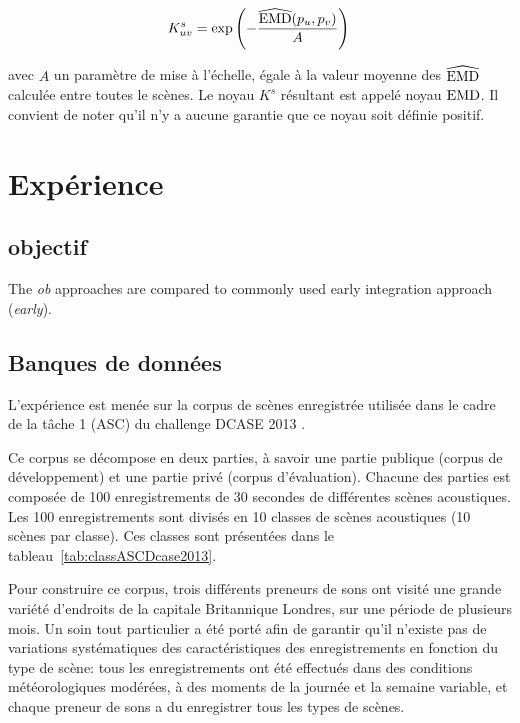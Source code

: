 \begin{equation}
\label{eq:ks}
K_{uv}^s = \exp\left( - \dfrac{\widehat{\mathrm{EMD}}(p_u,p_v)}{A} \right) \\
\end{equation}

avec $A$ un paramètre de mise à l'échelle, égale à la valeur moyenne des $\widehat{\mathrm{EMD}}$ calculée entre toutes le scènes. Le noyau $K^s$ résultant est appelé noyau $\mathrm{EMD}$. Il convient de noter qu'il n'y a aucune garantie que ce noyau soit définie positif.

\section{Expérience}

\subsection{objectif}


The \emph{ob} approaches are compared to commonly used early integration approach (\emph{early}).


\subsection{Banques de données}

L'expérience est menée sur la corpus de scènes enregistrée utilisée dans le cadre de la tâche 1 (ASC) du challenge DCASE 2013 \citep{giannoulis2013detection,Giannoulis2013database,Stowell15}.

Ce corpus se décompose en deux parties, à savoir une partie publique (corpus de développement) et une partie privé (corpus d'évaluation). Chacune des parties est composée de 100 enregistrements de 30 secondes de différentes scènes acoustiques. Les 100 enregistrements sont divisés en 10 classes de scènes acoustiques (10 scènes par classe). Ces classes sont présentées dans le tableau~\ref{tab:classASCDcase2013}. 

Pour construire ce corpus, trois différents preneurs de sons ont visité une grande variété d'endroits de la capitale Britannique Londres, sur une période de plusieurs mois. Un soin tout particulier a été porté afin de garantir qu'il n'existe pas de variations systématiques des caractéristiques des enregistrements en fonction du type de scène: tous les enregistrements ont été effectués dans des conditions météorologiques modérées, à des moments de la journée et la semaine variable, et chaque preneur de sons a du enregistrer tous les types de scènes. 

